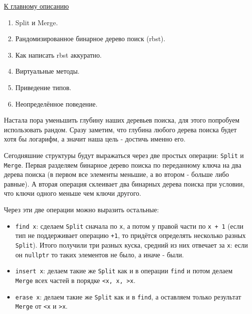 \label{md2tex8}
\hyperref[md2texREADME]{К главному описанию}


\begin{enumerate}
    \item Split и Merge.
    \item Рандомизированное бинарное дерево поиск (rbst).
    \item Как написать rbst аккуратно.
    \item Виртуальные методы.
    \item Приведение типов.
    \item Неопределённое поведение.
\end{enumerate}


Настала пора уменьшить глубину наших деревьев поиска, для этого попробуем использовать рандом. Сразу заметим, что глубина любого дерева поиска будет хотя бы логарифм, а значит наша цель - достичь именно его.


Сегодняшние структуры будут выражаться через две простых операции: \texttt{Split} и \texttt{Merge}. Первая разделяем бинарное дерево поиска по переданному ключа на два дерева поиска (в первом все элементы меньшие, а во втором - больше либо равные). А вторая операция склеивает два бинарных дерева поиска при условии, что ключи одного меньше чем ключи другого.

Через эти две операции можно выразить остальные:
\begin{itemize}
    \item \texttt{find x}: сделаем \texttt{Split} сначала по \texttt{x}, а потом у правой части по \texttt{x + 1} (если тип не поддерживает операцию \texttt{+1}, то придётся определять несколько разных \texttt{Split}). Итого получили три разных куска, средний из них отвечает за \texttt{x}: если он \texttt{nullptr} то таких элементов не было, а иначе - были.
    \item \texttt{insert x}: делаем такие же \texttt{Split} как и в операции \texttt{find} и потом делаем \texttt{Merge} всех частей в порядке \texttt{<x, x, >x}.
    \item \texttt{erase x}: делаем такие же \texttt{Split} как и в \texttt{find}, а оставляем только результат \texttt{Merge} от \texttt{<x} и \texttt{>x}.
\end{itemize}


